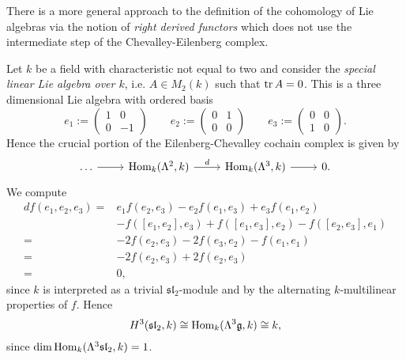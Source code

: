 \begin{remark}
	There is a more general approach to the definition of the cohomology of Lie algebras via the notion of \emph{right derived functors} which does not use the intermediate step of the Chevalley-Eilenberg complex. 
\end{remark}

\begin{example}[$H^3(\mathfrak{sl}_2,k)$]
	\label{ex:H^3_sl_2_k}
	Let $k$ be a field with characteristic not equal to two and consider the \emph{special linear Lie algebra over $k$}, i.e. $A \in M_2(k)$ such that $\operatorname{tr} A = 0$. This is a three dimensional Lie algebra with ordered basis 	
	\begin{equation*}
		e_1 := \begin{pmatrix}
			1 & 0\\
			0 & -1
		\end{pmatrix} \qquad
		e_2 := \begin{pmatrix}
			0 & 1\\
			0 & 0
		\end{pmatrix} \qquad
		e_3 := \begin{pmatrix}
			0 & 0\\
			1 & 0
		\end{pmatrix}.
	\end{equation*}
	Hence the crucial portion of the Eilenberg-Chevalley cochain complex is given by
	\begin{equation*}
		\begin{tikzcd}
			\dots \arrow[r] & \Hom_k(\Lambda^2,k) \arrow[r,"d"] & \Hom_k(\Lambda^3,k) \arrow[r] & 0.
		\end{tikzcd}
	\end{equation*}
	We compute
	\begin{align*}
		df(e_1,e_2,e_3) =& e_1f(e_2,e_3) - e_2f(e_1,e_3) + e_3f(e_1,e_2)\\
		&- f([e_1,e_2],e_3) + f([e_1,e_3],e_2) - f([e_2,e_3],e_1)\\
		=& -2f(e_2,e_3) - 2f(e_3,e_2) - f(e_1,e_1)\\
		=& -2f(e_2,e_3) + 2f(e_2,e_3)\\
		=& 0,
	\end{align*}
	\noindent since $k$ is interpreted as a trivial $\mathfrak{sl}_2$-module and by the alternating $k$-multilinear properties of $f$. Hence
	\begin{equation*}
		H^3(\mathfrak{sl}_2,k) \cong \operatorname{Hom}_k(\Lambda^3 \mathfrak{g},k) \cong k,
	\end{equation*}
	\noindent since $\dim \operatorname{Hom}_k(\Lambda^3\mathfrak{sl}_2,k) = 1$.
\end{example}

